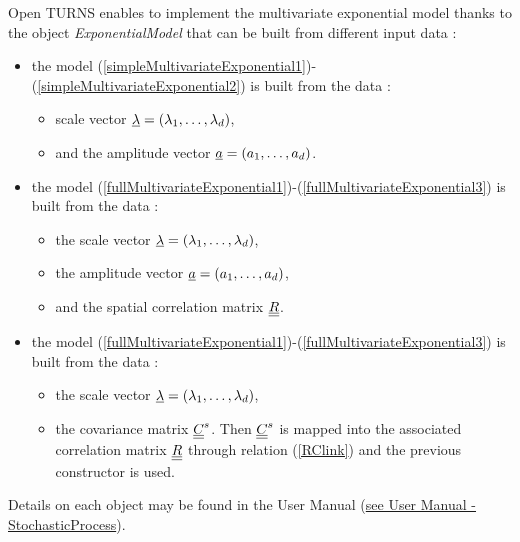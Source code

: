 Open TURNS enables to implement the multivariate exponential model thanks to the object {\itshape ExponentialModel} that can be built from different input data : 
\begin{itemize}
  \item the model (\ref{simpleMultivariateExponential1})-(\ref{simpleMultivariateExponential2}) is built from the data : 
    \begin{itemize}
       \item scale vector ${\underline{\lambda}}=(\lambda_1,\dots,\lambda_d)$,
       \item and the amplitude vector ${\underline{a}}=(a_1,\dots,a_d)$.
    \end{itemize}
  \item the model  (\ref{fullMultivariateExponential1})-(\ref{fullMultivariateExponential3}) is  built from the data : 
   \begin{itemize}
     \item the scale vector ${\underline{\lambda}}=(\lambda_1,\dots,\lambda_d)$, 
     \item the amplitude vector ${\underline{a}}=(a_1,\dots,a_d)$,
     \item and the spatial correlation matrix ${\underline{\underline{R}}}$. 
   \end{itemize}
  \item the model  (\ref{fullMultivariateExponential1})-(\ref{fullMultivariateExponential3}) is  built from the data : 
    \begin{itemize}
      \item the scale vector ${\underline{\lambda}}=(\lambda_1,\dots,\lambda_d)$,
      \item the covariance matrix ${\underline{\underline{C}}}^s$. Then  ${\underline{\underline{C}}}^s$ is mapped into the associated correlation matrix ${\underline{\underline{R}}}$ through relation (\ref{RClink}) and  the previous constructor is used.\\
    \end{itemize}
\end{itemize}



Details on each object may be found in the User Manual  (\href{OpenTURNS_UserManual_TUI.pdf}{see User Manual - StochasticProcess}).\\



